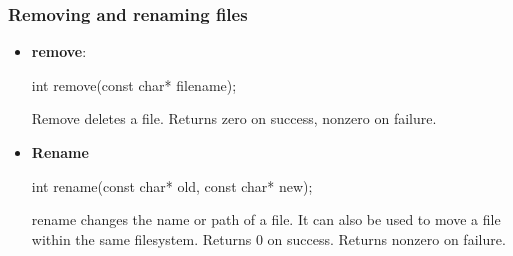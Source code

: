 \documentclass{report}
\begin{document}
    \pagebreak 
    \subsubsection{Removing and renaming files}
    \begin{itemize}
        \item \textbf{remove}: 
            \bigbreak \noindent 
            \begin{cppcode}
            int remove(const char* filename);
            \end{cppcode}
            \bigbreak \noindent
            Remove deletes a file.
            \bigbreak \noindent 
            Returns zero on success, nonzero on failure.
        \item \textbf{Rename}
            \bigbreak \noindent 
            \begin{cppcode}
            int rename(const char* old, const char* new);
            \end{cppcode}
            \bigbreak \noindent 
            rename changes the name or path of a file.
            \bigbreak \noindent 
            It can also be used to move a file within the same filesystem.
            \bigbreak \noindent 
            Returns 0 on success. Returns nonzero on failure.

    \end{itemize}
\end{document}
